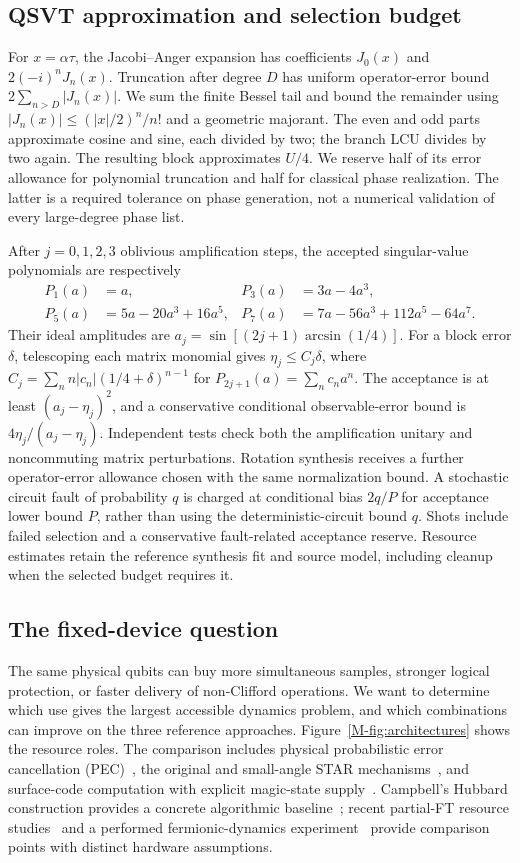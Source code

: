 \documentclass[11pt]{article}
\begin{document}
\subsection{QSVT approximation and selection budget}\label{app:qsvt-budget}
For $x=\alpha\tau$, the Jacobi--Anger expansion has coefficients
$J_0(x)$ and $2(-i)^nJ_n(x)$. Truncation after degree $D$ has uniform
operator-error bound $2\sum_{n>D}|J_n(x)|$. We sum the finite Bessel tail
and bound the remainder using
$|J_n(x)|\leq(|x|/2)^n/n!$ and a geometric majorant. The even and odd
parts approximate cosine and sine, each divided by two; the branch LCU
divides by two again. The resulting block approximates $U/4$.
We reserve half of its error allowance for polynomial truncation and half
for classical phase realization. The latter is a required tolerance on
phase generation, not a numerical validation of every large-degree phase list.

After $j=0,1,2,3$ oblivious amplification steps, the accepted singular-value
polynomials are respectively
\begin{align}
 P_1(a)&=a, &P_3(a)&=3a-4a^3,\\
 P_5(a)&=5a-20a^3+16a^5, &
 P_7(a)&=7a-56a^3+112a^5-64a^7.
\end{align}
Their ideal amplitudes are $a_j=\sin[(2j+1)\arcsin(1/4)]$.
For a block error $\delta$, telescoping each matrix monomial gives
$\eta_j\leq C_j\delta$, where
$C_j=\sum_n n|c_n|(1/4+\delta)^{n-1}$ for $P_{2j+1}(a)=\sum_nc_na^n$.
The acceptance is at least $(a_j-\eta_j)^2$, and a conservative conditional
observable-error bound is $4\eta_j/(a_j-\eta_j)$.
Independent tests check both the amplification unitary and noncommuting
matrix perturbations. Rotation synthesis receives a further operator-error
allowance chosen with the same normalization bound. A stochastic circuit
fault of probability $q$ is charged at conditional bias $2q/P$ for acceptance
lower bound $P$, rather than using the deterministic-circuit bound $q$.
Shots include failed selection and a conservative fault-related acceptance
reserve. Resource estimates retain the reference synthesis fit and source
model, including cleanup when the selected budget requires it.


\subsection{The fixed-device question}
The same physical qubits can buy more simultaneous samples, stronger logical
protection, or faster delivery of non-Clifford operations. We want to determine
which use gives the largest accessible dynamics problem, and which combinations
can improve on the three reference approaches. Figure~\ref{M-fig:architectures}
shows the resource roles. The comparison includes physical probabilistic error
cancellation (PEC)~\cite{temme}, the original and small-angle STAR mechanisms~\cite{akahoshi,toshio}, and surface-code computation with explicit magic-state
supply~\cite{litinski,gidney2024cultivation}. Campbell's Hubbard construction
provides a concrete algorithmic baseline~\cite{campbell}; recent partial-FT
resource studies~\cite{chung} and a performed fermionic-dynamics experiment~\cite{alam2025} provide comparison points with distinct hardware assumptions.
\end{document}
